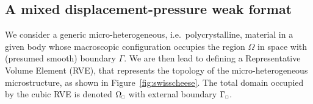 \documentclass{bmcart}
\newcommand{\tikzsetnextfilename}[1]{}
\newcommand{\tikzinput}[1]{\texttt{[image: \#1]}}
\newcommand{\figref}[1]{Figure~\ref{#1}}
\newcommand{\rve}{
  {\mathchoice
   {\mbox{\scalebox{0.67}{$\Box$}}}
   {\mbox{\scalebox{0.67}{$\Box$}}}
   {\mbox{\scalebox{0.5}{$\Box$}}}
   {\mbox{\scalebox{0.375}{$\Box$}}}
  }
}
\begin{document}
\subsection{A mixed displacement-pressure weak format}

We consider a generic micro-heterogeneous, i.e.\ polycrystalline, material in a given body whose macroscopic configuration occupies the region $\Omega$ in space with (presumed smooth) boundary $\Gamma$.
We are then lead to defining a Representative Volume Element (RVE), that represents the topology of the micro-heterogeneous microstructure, as shown in \figref{fig:swisscheese}.
The total domain occupied by the cubic RVE is denoted $\Omega_\rve$ with external boundary $\Gamma_\rve$.

\end{document}

